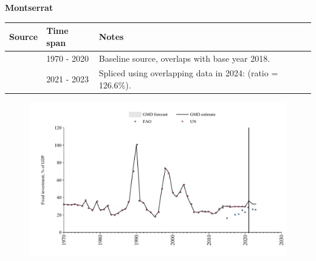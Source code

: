 \documentclass[12pt,a4paper,landscape]{article}
\begin{document}
\begin{adjustbox}{max totalsize={\paperwidth}{\paperheight},center}
\begin{minipage}[t][\textheight][t]{\textwidth}
\vspace*{0.5cm}
{}
\begin{center}
{\Large\bfseries Montserrat}
\end{center}
\vspace{0.5cm}
\begin{table}[H]
\centering
\small
\begin{tabular}{|l|l|l|}
\hline
\textbf{Source} & \textbf{Time span} & \textbf{Notes} \\
\hline
\rowcolor{white}\cite{UN}& 1970 - 2020 &Baseline source, overlaps with base year 2018.\\
\rowcolor{lightgray}\cite{FAO}& 2021 - 2023 &Spliced using overlapping data in 2024: (ratio = 126.6\%).\\
\hline
\end{tabular}
\end{table}
\begin{figure}[H]
\centering
\includegraphics[width=\textwidth,height=0.6\textheight,keepaspectratio]{graphs/MSR_finv_GDP.pdf}
\end{figure}
\end{minipage}
\end{adjustbox}
\end{document}
